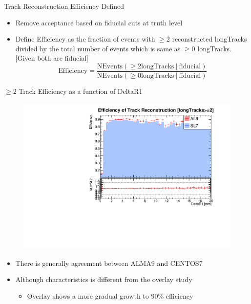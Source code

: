 \begin{frame}{Track Reconstruction Efficiency Defined}
    \begin{itemize}
        \item Remove acceptance based on fiducial cuts at truth level
        \item Define Efficiency as the fraction of events with $\geq$2 reconstructed longTracks divided by the total number of events which is same as $\geq$0 longTracks. [Given both are fiducial] 
        \[ \text{Efficiency} = \frac{\text{NEvents}({\geq 2 \text{longTracks}}\ | \ \text{fiducial})}{\text{NEvents}(\geq0{\text{longTracks}}\ | \ \text{fiducial})} \]
    \end{itemize}
\end{frame}

\begin{frame}{$\geq2$ Track Efficiency as a function of DeltaR1}
    \begin{figure}
        \includegraphics[width=0.7\linewidth]{./output/Effi_greq2_DeltaR1.pdf}
    \end{figure}
    \begin{itemize}
        \item There is generally agreement between ALMA9 and CENTOS7
        \item Although characteristics is different from the overlay study
        \begin{itemize}
            \item Overlay shows a more gradual growth to 90\% efficiency
        \end{itemize}
    \end{itemize}
\end{frame}

